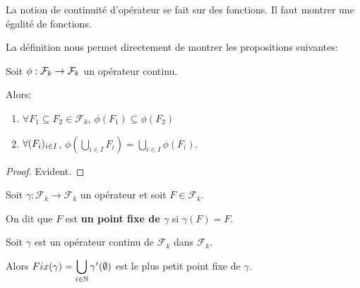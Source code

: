 \begin{remarque}
	La notion de continuité d'opérateur se fait sur des fonctions. Il faut
	montrer une égalité de fonctions.
\end{remarque}

La définition nous permet directement de montrer les propositions suivantes:

\begin{proposition}
	Soit $\phi : \mathcal{F}_{k} \rightarrow \mathcal{F}_{k}$ un opérateur
	continu.

	Alors:

	\begin{enumerate}
		\item $\forall F_{1} \subseteq F_{2} \in {\mathcal{F}_{k}}$,
			$\phi(F_{1}) \subseteq \phi(F_{2})$
		\item $\forall (F_{i})_{i \in I}$, $\displaystyle \phi(\bigcup_{i \in I} F_{i}) =
			\bigcup_{i \in I} \phi(F_{i})$.
	\end{enumerate}
\end{proposition}

\ifdefined\outputproof
\begin{proof}
	Evident.
\end{proof}
\fi

\begin{definition} 
	Soit $\gamma : \mathcal{F}_{k} \rightarrow \mathcal{F}_{k}$ un opérateur et
	soit $F \in \mathcal{F}_{k}$.

	On dit que $F$ est \textbf{un point fixe de $\gamma$} si $\gamma(F) = F$.
\end{definition}

\begin{theorem} 
	\label{theorem:plus_petit_point_fixe}
	Soit $\gamma$ est un opérateur continu de $\mathcal{F}_{k}$ dans
	$\mathcal{F}_{k}$.

	Alors $Fix(\gamma) = \displaystyle \bigcup_{i \in \mathbb{N}} \gamma^{i}(\emptyset)$ est le
	plus petit point fixe de $\gamma$.
\end{theorem}

